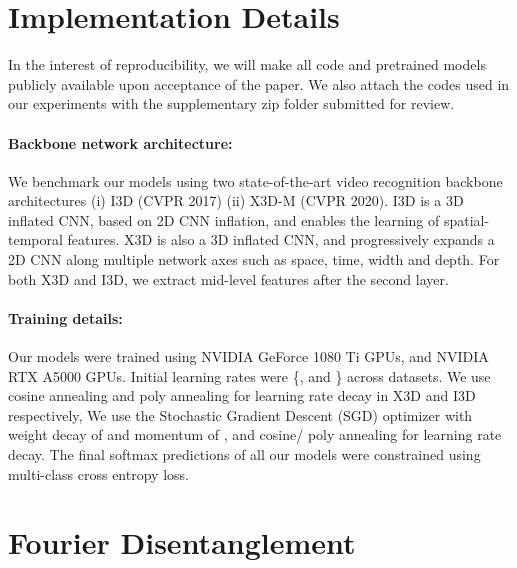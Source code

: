 \documentclass[runningheads]{llncs}
\begin{document}
\section{Implementation Details}

In the interest of reproducibility, we will make all code and pretrained models publicly available upon acceptance of the paper. We also attach the codes used in our experiments with the supplementary zip folder submitted for review. 

\label{exp:implementation}
\paragraph{Backbone network architecture:} We benchmark our models using two state-of-the-art video recognition backbone architectures (i) I3D \cite{carreira2017quo} (CVPR 2017) (ii) X3D-M \cite{feichtenhofer2020x3d} (CVPR 2020). I3D is a 3D inflated CNN, based on 2D CNN inflation, and enables the learning of spatial-temporal features. X3D is also a 3D inflated CNN, and progressively expands a 2D CNN along multiple network axes such as space, time, width and depth. 
For both X3D and I3D, we extract mid-level features after the second layer.

\paragraph{Training details:} Our models were trained using NVIDIA GeForce 1080 Ti GPUs, and NVIDIA RTX A5000 GPUs. Initial learning rates were \{, and \} across datasets. We use cosine annealing and poly annealing for learning rate decay in X3D and I3D respectively, 
We use the Stochastic Gradient Descent (SGD) optimizer with weight decay of  and momentum of , and cosine/ poly annealing for learning rate decay. The final softmax predictions of all our models were constrained using multi-class cross entropy loss. 

\section{Fourier Disentanglement}
\end{document}
